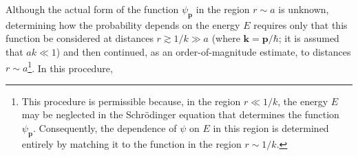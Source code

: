 Although the actual form of the function $\psi_{\mathbf p}$ in the region $r\sim a$ is unknown, determining how the probability depends on the energy $E$ requires only that this function be considered at distances $r\gtrsim1/k\gg a$ (where $\mathbf k=\mathbf p/\hbar$; it is assumed that $ak\ll1$) and then continued, as an order-of-magnitude estimate, to distances $r\sim a$\footnote{This procedure is permissible because, in the region $r\ll1/k$, the energy $E$ may be neglected in the Schrödinger equation that determines the function $\psi_{\mathbf p}$. Consequently, the dependence of $\psi$ on $E$ in this region is determined entirely by matching it to the function in the region $r\sim1/k$.}. In this procedure,
